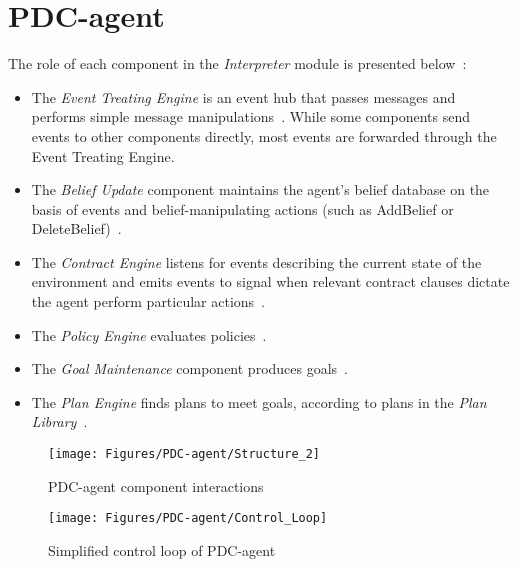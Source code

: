 \chapter{PDC-agent}
\label{appendix:pdc_agent}

\begin{definition}
    The role of each component in the \textit{Interpreter} module is presented below~\citep{liao_extended_2006}:

    \begin{itemize}
        \item The \textit{Event Treating Engine} is an event hub that passes messages and performs simple message manipulations~\citep{liao_extended_2006}.
            While some components send events to other components directly, most events are forwarded through the Event Treating Engine.
        \item The \textit{Belief Update} component maintains the agent's belief database on the basis of events and belief-manipulating actions (such as AddBelief or DeleteBelief)~\citep{liao_extended_2006}.
        \item The \textit{Contract Engine} listens for events describing the current state of the environment and emits events to signal when relevant contract clauses dictate the agent perform particular actions~\citep{liao_extended_2006}.
        \item The \textit{Policy Engine} evaluates policies~\citep{liao_extended_2006}.
        \item The \textit{Goal Maintenance} component produces goals~\citep{liao_extended_2006}.
        \item The \textit{Plan Engine} finds plans to meet goals, according to plans in the \textit{Plan Library}~\citep{liao_extended_2006}.
    \end{itemize}
\end{definition}

\begin{figure}[h]
    \texttt{[image: Figures/PDC-agent/Structure\_2]}
    \centering
    \caption{PDC-agent component interactions}
    \label{fig:pdc_agent_structure}
\end{figure}

\begin{landscape}
    \begin{figure}[h]
        \texttt{[image: Figures/PDC-agent/Control\_Loop]}
        \centering
        \caption{Simplified control loop of PDC-agent}
        \label{fig:pdc_agent_control_loop}
    \end{figure}
\end{landscape}

